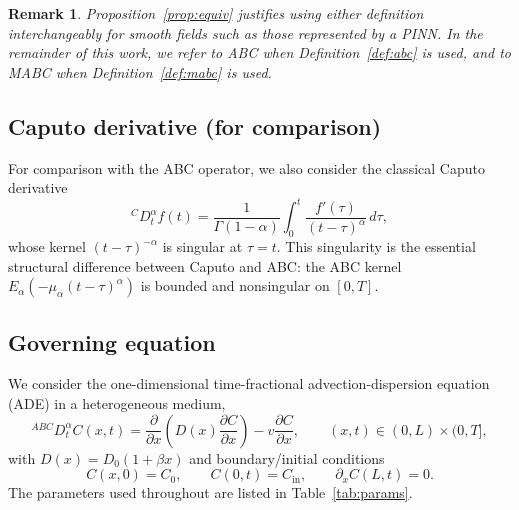 \documentclass[11pt]{article}
\newtheorem{remark}{Remark}
\begin{document}
\begin{remark}
Proposition~\ref{prop:equiv} justifies using either definition interchangeably for smooth fields such as those represented by a PINN. In the remainder of this work, we refer to \emph{ABC} when Definition~\ref{def:abc} is used, and to \emph{MABC} when Definition~\ref{def:mabc} is used.
\end{remark}

\subsection{Caputo derivative (for comparison)}
\label{sec:caputo}

For comparison with the ABC operator, we also consider the classical Caputo derivative
\begin{equation}
{}^{C}D_t^\alpha f(t)
=
\frac{1}{\Gamma(1-\alpha)}
\int_0^t \frac{f'(\tau)}{(t-\tau)^\alpha}\,d\tau,
\label{eq:caputo}
\end{equation}
whose kernel \((t-\tau)^{-\alpha}\) is singular at \(\tau = t\). This singularity is the essential structural difference between Caputo and ABC: the ABC kernel \(E_\alpha(-\mu_\alpha(t-\tau)^\alpha)\) is bounded and nonsingular on \([0,T]\).

\subsection{Governing equation}
\label{sec:gov}

We consider the one-dimensional time-fractional advection-dispersion equation (ADE) in a heterogeneous medium,
\begin{equation}
{}^{ABC}D_t^\alpha C(x,t)
=
\frac{\partial}{\partial x}\!\left(D(x)\frac{\partial C}{\partial x}\right)
-
v \frac{\partial C}{\partial x},
\qquad (x,t)\in(0,L)\times(0,T],
\label{eq:gov}
\end{equation}
with \(D(x) = D_0(1+\beta x)\) and boundary/initial conditions
\begin{equation}
C(x,0) = C_0, \qquad C(0,t) = C_{\mathrm{in}}, \qquad \partial_x C(L,t) = 0.
\end{equation}
The parameters used throughout are listed in Table~\ref{tab:params}.
\end{document}
